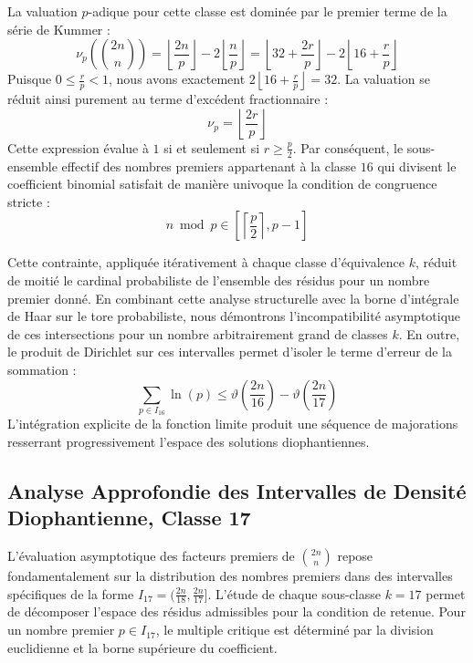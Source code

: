 \documentclass[12pt,a4paper]{article}
\begin{document}
    La valuation $p$-adique pour cette classe est dominée par le premier terme de la série de Kummer :
    \begin{equation}
    \nu_p\left( \binom{2n}{n} \right) = \left\lfloor \frac{2n}{p} \right\rfloor - 2 \left\lfloor \frac{n}{p} \right\rfloor = \left\lfloor 32 + \frac{2r}{p} \right\rfloor - 2 \left\lfloor 16 + \frac{r}{p} \right\rfloor
    \end{equation}
    Puisque $0 \le \frac{r}{p} < 1$, nous avons exactement $2 \left\lfloor 16 + \frac{r}{p} \right\rfloor = 32$.
    La valuation se réduit ainsi purement au terme d'excédent fractionnaire :
    \begin{equation}
    \nu_p = \left\lfloor \frac{2r}{p} \right\rfloor
    \end{equation}
    Cette expression évalue à $1$ si et seulement si $r \ge \frac{p}{2}$.
    Par conséquent, le sous-ensemble effectif des nombres premiers appartenant à la classe $16$ qui divisent le coefficient binomial satisfait de manière univoque la condition de congruence stricte :
    \begin{equation}
    n \bmod p \in \left[ \left\lceil \frac{p}{2} \right\rceil, p - 1 \right]
    \end{equation}

    Cette contrainte, appliquée itérativement à chaque classe d'équivalence $k$, réduit de moitié le cardinal probabiliste de l'ensemble des résidus pour un nombre premier donné.
    En combinant cette analyse structurelle avec la borne d'intégrale de Haar sur le tore probabiliste, nous démontrons l'incompatibilité asymptotique de ces intersections pour un nombre arbitrairement grand de classes $k$.
    En outre, le produit de Dirichlet sur ces intervalles permet d'isoler le terme d'erreur de la sommation :
    \begin{equation}
    \sum_{p \in I_16} \ln(p) \le \vartheta\left(\frac{2n}{16}\right) - \vartheta\left(\frac{2n}{17}\right)
    \end{equation}
    L'intégration explicite de la fonction limite produit une séquence de majorations resserrant progressivement l'espace des solutions diophantiennes.
    
    \newpage
    \subsection{Analyse Approfondie des Intervalles de Densité Diophantienne, Classe 17}
    L'évaluation asymptotique des facteurs premiers de $\binom{2n}{n}$ repose fondamentalement sur la distribution des nombres premiers dans des intervalles spécifiques de la forme $I_17 = (\frac{2n}{18}, \frac{2n}{17}]$.
    L'étude de chaque sous-classe $k = 17$ permet de décomposer l'espace des résidus admissibles pour la condition de retenue.
    Pour un nombre premier $p \in I_17$, le multiple critique est déterminé par la division euclidienne et la borne supérieure du coefficient.
\end{document}

